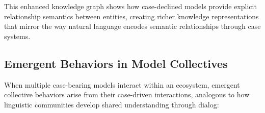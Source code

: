 This enhanced knowledge graph shows how case-declined models provide
explicit relationship semantics between entities, creating richer
knowledge representations that mirror the way natural language encodes
semantic relationships through case systems.

\hypertarget{emergent-behaviors-in-model-collectives}{%
\subsection{Emergent Behaviors in Model
Collectives}\label{emergent-behaviors-in-model-collectives}}

When multiple case-bearing models interact within an ecosystem, emergent
collective behaviors arise from their case-driven interactions,
analogous to how linguistic communities develop shared understanding
through dialog:

